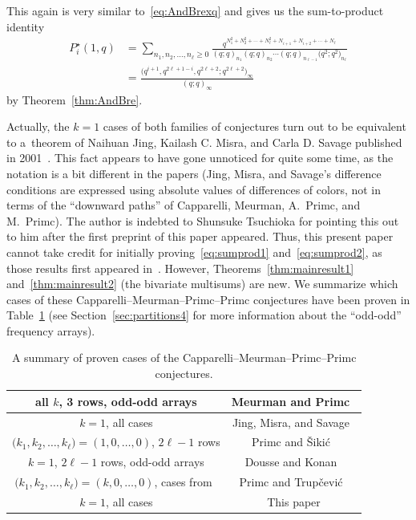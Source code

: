 \documentclass[10pt,a4paper]{amsart}
\numberwithin{equation}{section}
\theoremstyle{definition}
\begin{document}
This again is very similar to~\eqref{eq:AndBrexq} and gives us the sum-to-product identity
\begin{align}
P^\star_i(1,q)& =\sum_{n_1,n_2,\dots,n_{\ell}\ge 0} \frac{q^{N_1^2+N_2^2+\cdots+N_{\ell}^2+N_{i+1}+N_{i+2}+\cdots+N_{\ell}}}{(q;q)_{n_1}(q;q)_{n_2}
\cdots(q;q)_{n_{\ell-1}}\bigl(q^2;q^2\bigr)_{n_{\ell}}}\nonumber\\
& = \frac{\bigl(q^{i+1},q^{2\ell+1-i},q^{2\ell+2};q^{2\ell+2}\bigr)_\infty}{(q;q)_\infty}\label{eq:sumprod2}
\end{align}
by Theorem~\ref{thm:AndBre}.

Actually, the $k=1$ cases of both families of conjectures turn out to be equivalent to a~theorem of Naihuan Jing, Kailash C. Misra, and Carla D. Savage published in 2001~\cite{JMS}. This fact appears to have gone unnoticed for quite some time, as the notation is a bit different in the papers (Jing, Misra, and Savage's difference conditions are expressed using absolute values of differences of colors, not in terms of the ``downward paths'' of Capparelli, Meurman, A.~Primc, and M.~Primc). The author is indebted to Shunsuke Tsuchioka for pointing this out to him after the first preprint of this paper appeared. Thus, this present paper cannot take credit for initially proving~\eqref{eq:sumprod1} and~\eqref{eq:sumprod2}, as those results first appeared in~\cite{JMS}. However, Theorems~\ref{thm:mainresult1} and~\ref{thm:mainresult2} (the bivariate multisums) are new. We summarize which cases of these Capparelli--Meurman--Primc--Primc conjectures have been proven in Table~\ref{table} (see Section~\ref{sec:partitions4} for more information about the ``odd-odd'' frequency arrays).

\begin{table}[ht] \label{table}
 \centering\small\renewcommand{\arraystretch}{1.2}
 \begin{tabular}{|c|c|} \hline
all $k$, 3 rows, odd-odd arrays & Meurman and Primc~\cite{MP} \\ \hline
$k=1$, all cases & Jing, Misra, and Savage~\cite{JMS} \\ \hline
$\bigl(k_1,k_2,\dots,k_\ell\bigr)=(1, 0,\dots , 0)$, $2\ell-1$ rows&Primc and \v{S}iki\'{c}~\cite{PS2} \\ \hline
$k=1$, $2\ell-1$ rows, odd-odd arrays & Dousse and Konan~\cite{DouKon} \\ \hline
$\bigl(k_1,k_2,\dots,k_\ell\bigr)=(k, 0,\dots , 0)$, cases from~\cite{CMPP}&Primc and Trup\v{c}evi\'{c}~\cite{PT} \\\hline
$k=1$, all cases & This paper \\\hline
 \end{tabular}
 \caption{A summary of proven cases of the Capparelli--Meurman--Primc--Primc conjectures.}
\end{table}
\end{document}
